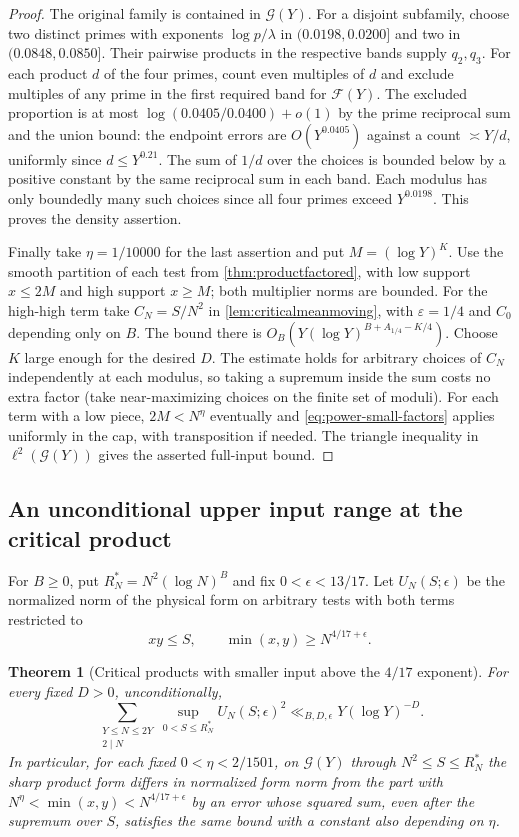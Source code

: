 \documentclass[11pt,a4paper]{article}
\numberwithin{equation}{section}
\newtheorem{theorem}{Theorem}[section]
\begin{document}
\begin{proof}
The original family is contained in $\mathcal G(Y)$. For a
disjoint subfamily, choose two distinct primes with exponents
$\log p/\lambda$ in $(0.0198,0.0200]$ and two in
$(0.0848,0.0850]$. Their pairwise products in the respective
bands supply $q_2,q_3$. For each product $d$ of the four primes,
count even multiples of $d$ and exclude multiples of any prime
in the first required band for $\mathcal F(Y)$. The excluded
proportion is at most $\log(0.0405/0.0400)+o(1)$ by the
prime reciprocal sum and the union bound: the endpoint errors
are $O(Y^{0.0405})$ against a count $\asymp Y/d$, uniformly
since $d\le Y^{0.21}$. The sum of $1/d$ over the choices is
bounded below by a positive constant by the same reciprocal
sum in each band. Each modulus has only boundedly many such
choices since all four primes exceed $Y^{0.0198}$. This proves
the density assertion.

Finally take $\eta=1/10000$ for the last assertion and put
$M=(\log Y)^K$. Use the smooth partition of each test from
\cref{thm:productfactored}, with low support $x\le2M$ and high
support $x\ge M$; both multiplier norms are bounded. For the
high-high term take $C_N=S/N^2$ in \cref{lem:criticalmeanmoving},
with $\varepsilon=1/4$ and $C_0$ depending only on $B$.
The bound there is $O_B(Y(\log Y)^{B+A_{1/4}-K/4})$. Choose
$K$ large enough for the desired $D$. The estimate holds for
arbitrary choices of $C_N$ independently at each modulus, so
taking a supremum inside the sum costs no extra factor (take
near-maximizing choices on the finite set of moduli).
For each term with a low piece, $2M<N^\eta$ eventually and
\cref{eq:power-small-factors} applies uniformly in the cap,
with transposition if needed. The triangle inequality in
$\ell^2(\mathcal G(Y))$ gives the asserted full-input bound.
\end{proof}

\subsection{An unconditional upper input range at the critical product}

For $B\ge0$, put $R_N^*=N^2(\log N)^B$ and fix $0<\epsilon<13/17$.
Let $U_N(S;\epsilon)$ be the normalized norm of the physical
form on arbitrary tests with both terms restricted to
\[
 xy\le S,\qquad \min(x,y)\ge N^{4/17+\epsilon}.
\]
\begin{theorem}[Critical products with smaller input above the $4/17$ exponent]
\label{thm:unconditional-upper-inputs}
For every fixed $D>0$, unconditionally,
\[
 \sum_{\substack{Y\le N\le2Y\\2\mid N}}
       \sup_{0<S\le R_N^*} U_N(S;\epsilon)^2
       \ll_{B,D,\epsilon}Y(\log Y)^{-D}.
\]
In particular, for each fixed $0<\eta<2/1501$, on
$\mathcal G(Y)$ through $N^2\le S\le R_N^*$
the sharp product form differs in normalized form norm from the
part with $N^\eta<\min(x,y)<N^{4/17+\epsilon}$ by an error
whose squared sum, even after the supremum over $S$, satisfies
the same bound with a constant also depending on $\eta$.
\end{theorem}
\end{document}
